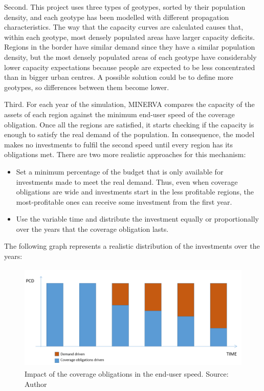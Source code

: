 Second. This project uses three types of geotypes, sorted by their population density, and each geotype has been modelled with different propagation characteristics. The way that the capacity curves are calculated causes that, within each geotype, most densely populated areas have larger capacity deficits. Regions in the border have similar demand since they have a similar population density, but the most densely populated areas of each geotype have considerably lower capacity expectations because people are expected to be less concentrated than in bigger urban centres. A possible solution could be to define more geotypes, so differences between them become lower. \par

Third. For each year of the simulation, MINERVA compares the capacity of the assets of each region against the minimum end-user speed of the coverage obligation. Once all the regions are satisfied, it starts checking if the capacity is enough to satisfy the real demand of the population. In consequence, the model makes no investments to fulfil the second speed until every region has its obligations met. There are two more realistic approaches for this mechanism:\par

\begin{itemize}
	\item Set a minimum percentage of the budget that is only available for investments made to meet the real demand. Thus, even when coverage obligations are wide and investments start in the less profitable regions, the most-profitable ones can receive some investment from the first year. \par

	\item Use the variable time and distribute the investment equally or proportionally over the years that the coverage obligation lasts.
\end{itemize}\par

The following graph represents a realistic distribution of the investments over the years:\par




\begin{figure}[H]
	\begin{Center}
		\includegraphics[width=4.6in,height=2.0in]{./media/image104.png}
		\caption{Impact of the coverage obligations in the end-user speed. Source: Author}

	\end{Center}
\end{figure}


